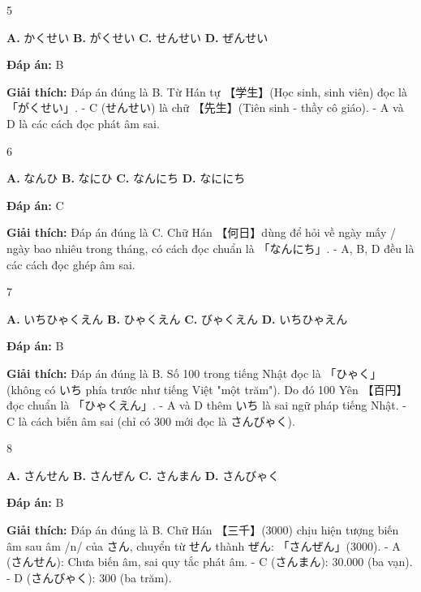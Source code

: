 \documentclass[12pt,a4paper]{report}
\newcommand{\source}[1]{}
\newcommand{\choice}[2]{\textbf{#1.} #2 \quad}
\newcommand{\answer}[1]{\par\textbf{Đáp án:} #1}
\newcommand{\confidence}[1]{}
\newcommand{\explain}[1]{\par\textbf{Giải thích:} #1\vspace{0.5cm}}
\begin{document}
\begin{question}{5}
\source{24.webp}
\choice{A}{かくせい}
\choice{B}{がくせい}
\choice{C}{せんせい}
\choice{D}{ぜんせい}
\answer{B}
\confidence{high}
\explain{Đáp án đúng là B. Từ Hán tự 【学生】(Học sinh, sinh viên) đọc là 「がくせい」.
- C (せんせい) là chữ 【先生】(Tiên sinh - thầy cô giáo).
- A và D là các cách đọc phát âm sai.}
\end{question}

\begin{question}{6}
\source{27.webp}
\choice{A}{なんひ}
\choice{B}{なにひ}
\choice{C}{なんにち}
\choice{D}{なににち}
\answer{C}
\confidence{high}
\explain{Đáp án đúng là C. Chữ Hán 【何日】dùng để hỏi về ngày mấy / ngày bao nhiêu trong tháng, có cách đọc chuẩn là 「なんにち」.
- A, B, D đều là các cách đọc ghép âm sai.}
\end{question}

\begin{question}{7}
\source{Q1.jpg}
\choice{A}{いちひゃくえん}
\choice{B}{ひゃくえん}
\choice{C}{びゃくえん}
\choice{D}{いちひゃえん}
\answer{B}
\confidence{high}
\explain{Đáp án đúng là B. Số 100 trong tiếng Nhật đọc là 「ひゃく」(không có いち phía trước như tiếng Việt "một trăm"). Do đó 100 Yên 【百円】đọc chuẩn là 「ひゃくえん」.
- A và D thêm いち là sai ngữ pháp tiếng Nhật.
- C là cách biến âm sai (chỉ có 300 mới đọc là さんびゃく).}
\end{question}

\begin{question}{8}
\source{Q2.jpg}
\choice{A}{さんせん}
\choice{B}{さんぜん}
\choice{C}{さんまん}
\choice{D}{さんびゃく}
\answer{B}
\confidence{high}
\explain{Đáp án đúng là B. Chữ Hán 【三千】(3000) chịu hiện tượng biến âm sau âm /n/ của さん, chuyển từ せん thành ぜん: 「さんぜん」(3000).
- A (さんせん): Chưa biến âm, sai quy tắc phát âm.
- C (さんまん): 30.000 (ba vạn).
- D (さんびゃく): 300 (ba trăm).}
\end{question}
\end{document}
